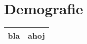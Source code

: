 \documentclass[oneside,10pt,a4paper]{report}
\begin{document}
\section{Demografie}

\begin{table}[h]
\begin{tabular}{ll}
\toprule
bla & ahoj \\
\bottomrule
\end{tabular}
\end{table}
\end{document}
